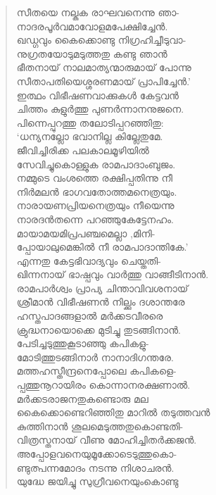 \begin{verse}
സീതയെ നല്കുക രാഘവനെന്നു ഞാ-\\
നാദരപൂര്‍വമാവോളമപേക്ഷിച്ചേന്‍.\\
ഖഡ്ഗവും കൈക്കൊണ്ടു നിഗ്രഹിച്ചീടുവാ-\\
നുഗ്രതയോടുമടുത്തതു കണ്ടു ഞാന്‍\\
ഭീതനായ് നാലമാത്യന്മാരുമായ് പോന്നു\\
സീതാപതിയെശ്ശരണമായ് പ്രാപിച്ചേന്‍.’\\
ഇത്ഥം വിഭീഷണവാക്കുകള്‍ കേട്ടവന്‍\\
ചിത്തം കുളുര്‍ത്തു പുണര്‍ന്നാനനുജനെ.\\
പിന്നെപ്പുറത്തു തലോടിപ്പറഞ്ഞിതു:\\
‘ധന്യനല്ലോ ഭവാനില്ല കില്ലേതുമേ.\\
ജീവിച്ചിരിക്ക പലകാലമൂഴിയില്‍\\
സേവിച്ചുകൊള്ളുക രാമപാദാംബുജം.\\
നമ്മുടെ വംശത്തെ രക്ഷിപ്പതിന്നു നീ\\
നിര്‍മലന്‍ ഭാഗവതോത്തമനെത്രയും.\\
നാരായണപ്രിയനെത്രയും നീയെന്നു\\
നാരദന്‍തന്നെ പറഞ്ഞുകേട്ടേനഹം.\\
മായാമയമിപ്രപഞ്ചമെല്ലാ ,മിനി-\\
പ്പോയാലുമെങ്കില്‍ നീ രാമപാദാന്തികേ.’\\
എന്നതു കേട്ടഭിവാദ്യവും ചെയ്തതി-\\
ഖിന്നനായ് ഭാഷ്പവും വാര്‍ത്തു വാങ്ങീടിനാന്‍.\\
രാമപാര്‍ശ്വം പ്രാപ്യ ചിന്താവിവശനായ്\\
ശ്രീമാന്‍ വിഭീഷണന്‍ നില്ക്കും ദശാന്തരേ\\
ഹസ്തപാദങ്ങളാല്‍ മര്‍ക്കടവീരരെ\\
ക്രുദ്ധനായൊക്കെ മുടിച്ചു തുടങ്ങിനാന്‍.\\
പേടിച്ചടുത്തുകൂടാഞ്ഞു കപികളു-\\
മോടിത്തുടങ്ങിനാര്‍ നാനാദിഗന്തരേ.\\
മത്തഹസ്തീന്ദ്രനെപ്പോലെ കപികളെ-\\
പ്പത്തുനൂറായിരം കൊന്നാനരക്ഷണാല്‍.\\
മര്‍ക്കടരാജനതുകണ്ടൊരു മല\\
കൈക്കൊണ്ടെറിഞ്ഞിതു മാറില്‍ തടുത്തവന്‍\\
കുത്തിനാന്‍ ശൂലമെടുത്തതുകൊണ്ടതി-\\
വിത്രസ്തനായ് വീണു മോഹിച്ചിതര്‍ക്കജന്‍.\\
അപ്പോളവനെയുമൂക്കോടെടുത്തുകൊ-\\
ണ്ടുത്പന്നമോദം നടന്നു നിശാചരന്‍.\\
യുദ്ധേ ജയിച്ചു സുഗ്രീവനെയുംകൊണ്ടു\\

\end{verse}
